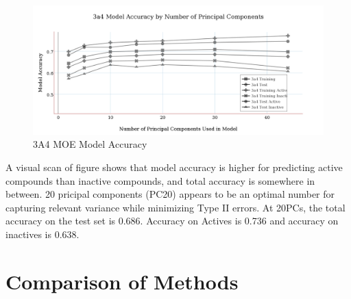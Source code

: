 \begin{figure}[!h]
\includegraphics[width=1\textwidth]{../img/3a4_moe_model_accuracy.png}
\caption{3A4 MOE Model Accuracy}
\end{figure}

A visual scan of figure shows that model accuracy is higher for predicting active compounds than inactive compounds, and total accuracy is somewhere in between. 20 pricipal components (PC20) appears to be an optimal number for capturing relevant variance while minimizing Type II errors. At 20PCs, the total accuracy on the test set is 0.686. Accuracy on Actives is 0.736 and accuracy on inactives is 0.638.

\section{Comparison of Methods}


